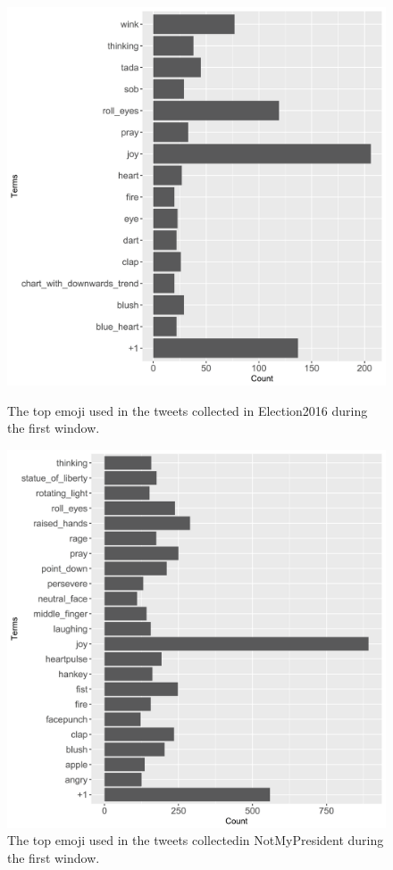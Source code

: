 \documentclass[prodmode]{acmsmall} %
\begin{document}
\begin{figure}
\centering
\begin{minipage}[b]{.49\textwidth}
    \includegraphics[width = \textwidth]{emoji-election2016}
\caption{The top emoji used in the tweets collected in Election2016 during the
  first window.}
\label{election2016 emoji}
\end{minipage}\hfill
\begin{minipage}[b]{.49\textwidth}
    \includegraphics[width = \textwidth]{emoji-notmypresident}
\caption{The top emoji used in the tweets collectedin NotMyPresident during the first window.}
\label{notmypresident emoji}
\end{minipage}
\end{figure}
\end{document}
